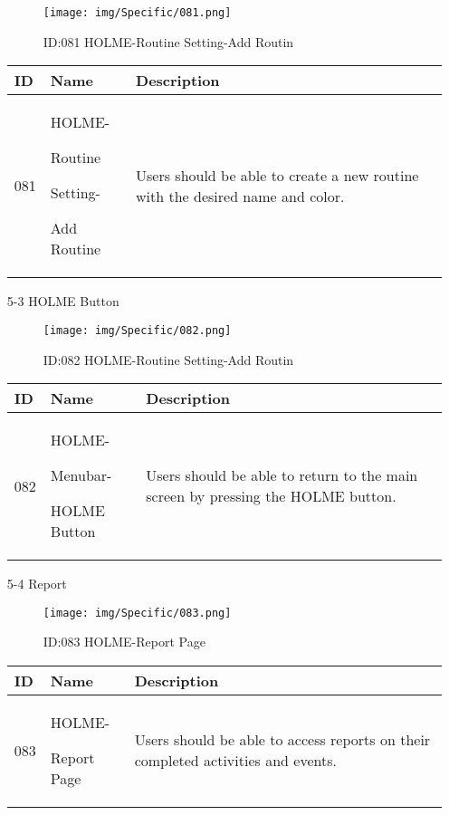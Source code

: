 \documentclass[conference]{IEEEtran}
\begin{document}
\begin{enumerate}
\begin{figure}[h]
\centering                                         
\texttt{[image: img/Specific/081.png]}
\caption{ID:081 HOLME-Routine Setting-Add Routin}
\end{figure}
\begin{table}[h]
\def\arraystretch{1.2} \small
    \begin{tabular}{|p{1cm}|p{1.8cm}|p{5.0cm}|}
        \hline
        ID & Name & Description\\ \hline
         081 \par  & HOLME-\par Routine \par Setting- \par Add Routine & 
         Users should be able to create a new routine with the desired name and color.
         \\ \hline
    \end{tabular}
\end{table}
\vspace{3cm}
\item[5-3] HOLME Button \\
\begin{figure}[h]
\centering                                         
\texttt{[image: img/Specific/082.png]}
\caption{ID:082 HOLME-Routine Setting-Add Routin}
\end{figure}
\begin{table}[h]
\def\arraystretch{1.2} \small
    \begin{tabular}{|p{1cm}|p{1.8cm}|p{5.0cm}|}
        \hline
        ID & Name & Description\\ \hline
         082 \par  & HOLME-\par Menubar- \par HOLME Button & 
         Users should be able to return to the main screen by pressing the HOLME button.
         \\ \hline
    \end{tabular}
\end{table}

\vspace{1cm}
\item[5-4] Report \\
\begin{figure}[h]
\centering                                         
\texttt{[image: img/Specific/083.png]}
\caption{ID:083 HOLME-Report Page}
\end{figure}
\begin{table}[h]
\def\arraystretch{1.2} \small
    \begin{tabular}{|p{1cm}|p{1.8cm}|p{5.0cm}|}
        \hline
        ID & Name & Description\\ \hline
         083 \par  & HOLME-\par Report Page & 
         Users should be able to access reports on their completed activities and events.
         \\ \hline
    \end{tabular}
\end{table}
\clearpage



\end{enumerate}
\end{document}
